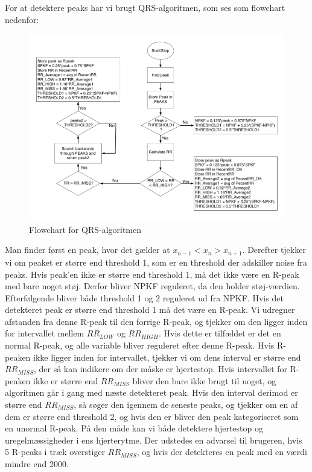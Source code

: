 \documentclass{article}
\begin{document}
For at detektere peaks har vi brugt QRS-algoritmen, som ses som flowchart nedenfor:
\begin{figure}[h]
	\centering
	\includegraphics[scale=0.45]{QRS-diagram.png}
	\caption{Flowchart for QRS-algoritmen}
\end{figure}

Man finder først en peak, hvor det gælder at $x_{n-1} < x_n > x_{n+1}$. Derefter tjekker vi om peaket er større end threshold 1, som er en threshold der adskiller noise fra peaks. Hvis peak’en ikke er større end threshold 1, må det ikke være en R-peak med bare noget støj. Derfor bliver NPKF reguleret, da den holder støj-værdien. Efterfølgende bliver både threshold 1 og 2 reguleret ud fra NPKF. Hvis det detekteret peak er større end threshold 1 må det være en R-peak. Vi udregner afstanden fra denne R-peak til den forrige R-peak, og tjekker om den ligger inden for intervallet mellem $RR_{LOW}$ og $RR_{HIGH}$. Hvis dette er tilfældet er det en normal R-peak, og alle variable bliver reguleret efter denne R-peak. Hvis R-peaken ikke ligger inden for intervallet, tjekker vi om dens interval er større end $RR_{MISS}$, der så kan indikere om der måske er hjertestop. Hvis intervallet for R-peaken ikke er større end $RR_{MISS}$ bliver den bare ikke brugt til noget, og algoritmen går i gang med næste detekteret peak. Hvis den interval derimod er større end $RR_{MISS}$, så søger den igennem de seneste peaks, og tjekker om en af dem er større end threshold 2, og hvis den er bliver den peak kategoriseret som en unormal R-peak. På den måde kan vi både detektere hjertestop og uregelmæssigheder i ens hjerterytme. 
Der udstedes en advarsel til brugeren, hvis 5 R-peaks i træk overstiger $RR_{MISS}$, og hvis der detekteres en peak med en værdi mindre end 2000.
\end{document}
